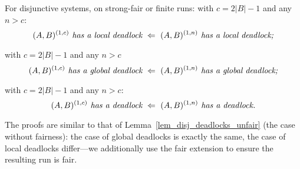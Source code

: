 \begin{lemma} \label{le:disj:fair_tight_deadlock}
For disjunctive systems, on strong-fair or finite runs:
\li
  \- with $c=2|B|-1$ and any $n>c$:
  $$(A,B)^{(1,c)} \textit{ has a local deadlock} \ \Leftarrow\ (A,B)^{(1,n)} \textit{ has a local deadlock;}$$
  
  \- with $c=2|B| - 1$ and any $n>c$
  $$(A,B)^{(1,c)} \textit{ has a global deadlock} \ \Leftarrow\ (A,B)^{(1,n)} \textit{ has a global deadlock;} $$
  
  \- with $c=2|B|-1$ and any $n>c$:
  $$(A,B)^{(1,c)} \textit{ has a deadlock} \ \Implied\ (A,B)^{(1,n)} \textit{ has a deadlock.}$$
\il
\end{lemma}
The proofs are similar to that of Lemma~\ref{lem_disj_deadlocks_unfair} (the case without fairness):
the case of global deadlocks is exactly the same,
the case of local deadlocks differ---we additionally use the fair extension to ensure the resulting run is fair.
